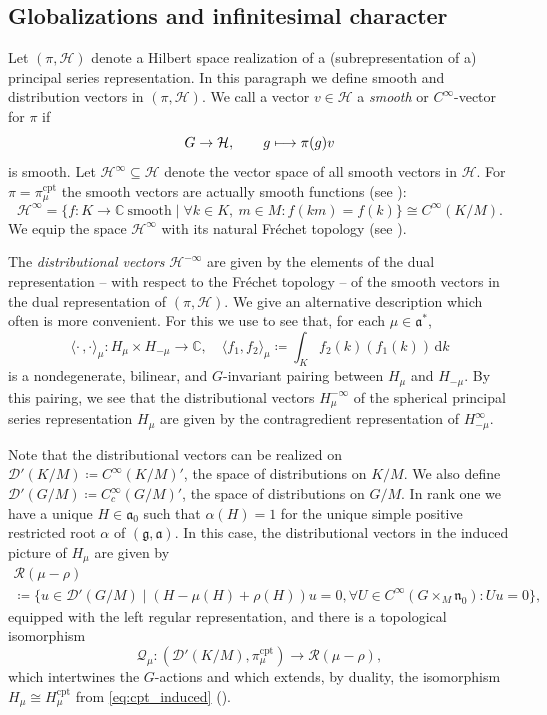 \documentclass[JEP,XML,SOM,NoFloatCountersInSection,Unicode,published]{cedram}
\let\ra\rightarrow
\newcommand\mto{\mathchoice{\longmapsto}{\mapsto}{\mapsto}{\mapsto}}
\theoremstyle{definition}
\newcommand{\mc}[1]{\ensuremath{\mathcal{#1}}}
\newcommand{\mf}[1]{\ensuremath{\mathfrak{#1}}}
\newcommand{\rhoa}{\ensuremath{\rho}}
\newcommand{\C}{\ensuremath{\mathbb{C}}}
\newcommand{\ps}[2]{\ensuremath{H_{#2}}}
\newcommand{\pss}[2]{\ensuremath{H_{#2}^\infty}}
\newcommand{\psd}[2]{\ensuremath{H_{#2}^{-\infty}}}
\newcommand{\pst}[1]{\ensuremath{H_{#1}}}
\newcommand{\psct}[1]{\ensuremath{H_{#1}^{\mathrm{cpt}}}}
\newcommand{\intd}{\ensuremath{\,\mathrm{d}}}
\begin{document}
\subsection{Globalizations and infinitesimal character}
Let $(\pi,\mc H)$ denote a Hilbert space realization of a (subrepresentation of a) principal series representation. In this paragraph we define smooth and distribution vectors in $(\pi,\mc H)$. We call a vector $v\in\mc H$ a \emph{smooth} or $C^\infty$-vector for $\pi$ if
\[
G\to\mc H,\qquad g\mto\pi(g)v
\]
is smooth. Let $\mc H^\infty\subseteq\mc H$ denote the vector space of all smooth vectors in $\mc H$. For $\pi=\pi_{\mu}^{\mathrm{cpt}}$ the smooth vectors are actually smooth functions (see \eg \cite[Eq.\,(5.15)(a)]{VoganUnitaryRep}):
\[
\mc H^\infty=\{f:K\ra\C\ \text{smooth}\mid\forall k\in K,\ m\in M \colon f(km)=f(k)\}\cong C^\infty(K/M).
\]
We equip the space $\mc H^\infty$ with its natural Fréchet topology (see \eg \cite[p.\,18]{VoganUnitaryRep}).

The \emph{distributional vectors} $\mc H^{-\infty}$ are given by the elements of the dual representation -- with respect to the Fréchet topology -- of the smooth vectors in the dual representation of $(\pi,\mc H)$. We give an alternative description which often is more convenient. For this we use \cite[Ch.\,I, \S 5.3., Eq.\,(25)]{GAGA} to see that, for each $\mu\in\mf a^*$,
\[
\langle\cdot\,,\cdot\rangle_{\mu}\colon\ps{\sigma}{\mu}\times\ps{\tilde\sigma}{-\mu}\to\C,\quad \langle f_1,f_2\rangle_{\mu}\coloneqq\int_Kf_2(k)(f_1(k))\intd k
\]
is a nondegenerate, bilinear, and $G$-invariant pairing between $\ps{\sigma}{\mu}$ and $\ps{\tilde\sigma}{-\mu}$. By this pairing, we see that the distributional vectors $\psd{\sigma}{\mu}$ of the spherical principal series representation $\ps{\sigma}{\mu}$ are given by the contragredient representation of $\pss{\tilde\sigma}{-\mu}$.

Note that the distributional vectors can be realized on $\mc D'(K/M)\coloneqq C^\infty(K/M)'$, the space of distributions on $K/M$. We also define $\mc D'(G/M)\coloneqq C_c^\infty(G/M)'$, the space of distributions on $G/M$. In rank one we have a unique $H\in\mf a_0$ such that $\alpha(H)=1$ for the unique simple positive restricted root $\alpha$ of $(\mf g,\mf a)$. In this case, the distributional vectors in the induced picture of $\pst{\mu}$ are given by
\begin{multline}
\label{eq:distr_elem_ps}
\mc R(\mu-\rhoa)\\
\coloneqq\{u\in\mc D'(G/M)\mid (H-\mu(H)+\rhoa(H))u=0,\forall U\in C^\infty(G\times_M\mf n_0)\colon Uu=0\},
\end{multline}
equipped with the left regular representation, and there is a topological isomorphism
\begin{equation}\label{eq:end_point}
\mc Q_\mu\colon(\mc D'(K/M),\pi_{\mu}^{\mathrm{cpt}})\to\mc R(\mu-\rhoa),
\end{equation}
which intertwines the $G$-actions and which extends, by duality, the isomorphism $\pst{\mu}\cong\psct{\mu}$ from \eqref{eq:cpt_induced} (\cf \cite[Prop.\,3.7]{GHWb}).
\end{document}
